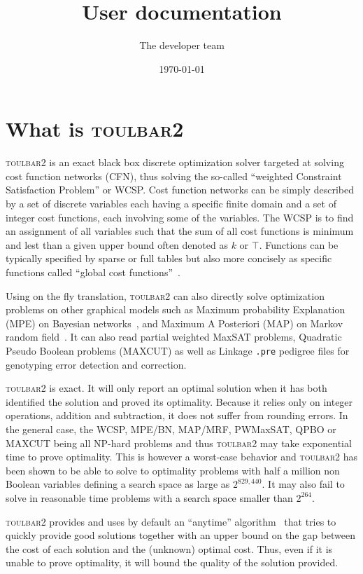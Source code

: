 \documentclass{article}
\title{\toulbar2 User documentation}
\author{The \toulbar2 developer team}
\date{\today}
\def\toulbar2{\textsc{toulbar2}}
\begin{document}
\maketitle
\section{What is \toulbar2}

\toulbar2 is an exact black box discrete optimization solver targeted
at solving cost function networks (CFN), thus solving the so-called
``weighted Constraint Satisfaction Problem'' or WCSP. Cost function
networks can be simply described by a set of discrete variables each
having a specific finite domain and a set of integer cost functions,
each involving some of the variables. The WCSP is to find an
assignment of all variables such that the sum of all cost functions is
minimum and lest than a given upper bound often denoted as $k$ or
$\top$. Functions can be typically specified by sparse or full tables
but also more concisely as specific functions called ``global cost
functions''~\cite{Schiex16a}.

Using on the fly translation, \toulbar2 can also directly solve
optimization problems on other graphical models such as Maximum
probability Explanation (MPE) on Bayesian networks~\cite{koller2009}, and
Maximum A Posteriori (MAP) on Markov random field~\cite{koller2009}. It can also
read partial weighted MaxSAT problems, Quadratic Pseudo Boolean
problems (MAXCUT) as well as Linkage \texttt{.pre} pedigree files for
genotyping error detection and correction.

\toulbar2 is exact. It will only report an optimal solution when it
has both identified the solution and proved its optimality. Because it
relies only on integer operations, addition and subtraction, it does
not suffer from rounding errors. In the general case, the WCSP,
MPE/BN, MAP/MRF, PWMaxSAT, QPBO or MAXCUT being all NP-hard problems
and thus \toulbar2 may take exponential time to prove optimality. This
is however a worst-case behavior and \toulbar2 has been shown to be
able to solve to optimality problems with half a million non Boolean
variables defining a search space as large as $2^{829,440}$. It may
also fail to solve in reasonable time problems with a search space
smaller than $2^{264}$.

\toulbar2 provides and uses by default an ``anytime''
algorithm~\cite{Katsirelos15a} that tries to quickly provide good solutions together
with an upper bound on the gap between the cost of each solution and
the (unknown) optimal cost. Thus, even if it is unable to prove
optimality, it will bound the quality of the solution provided.
\end{document}

